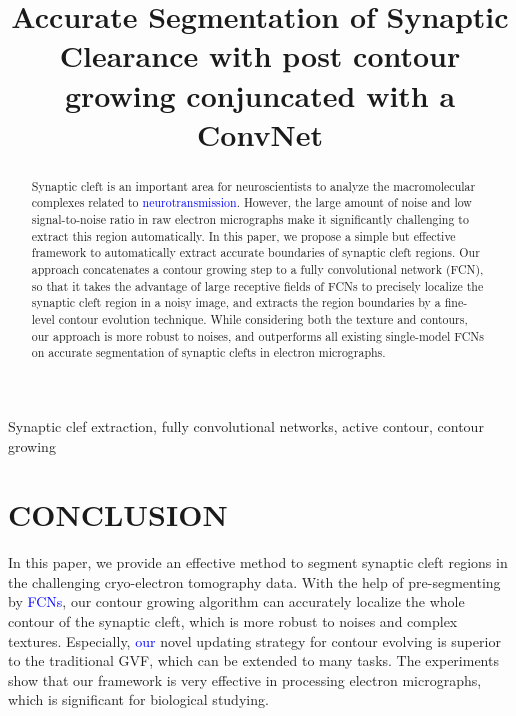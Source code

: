 \documentclass{article}
\newcommand{\change}[1]{\textcolor{blue}{#1}}
\begin{document}
\sloppy

\def\x{{\mathbf x}}
\def\L{{\cal L}}


\title{Accurate Segmentation of Synaptic Clearance with post contour growing conjuncated with a ConvNet}
%
\address{}


\maketitle


%
\begin{abstract}

Synaptic cleft is an important area for neuroscientists to analyze the macromolecular complexes related to \change{neurotransmission}.
However, the large amount of noise and low signal-to-noise ratio in raw electron micrographs make it significantly challenging to extract this region automatically.
%
In this paper, we propose a simple but effective framework to automatically extract accurate boundaries of synaptic cleft regions.
Our approach concatenates a contour growing step to a fully convolutional network (FCN), so that it takes the advantage of large receptive fields of FCNs to precisely localize the synaptic cleft region in a noisy image, and extracts the region boundaries by a fine-level contour evolution technique.
%
While considering both the texture and contours, our approach is more robust to noises, and outperforms all existing single-model FCNs on accurate segmentation of synaptic clefts in electron micrographs.


\end{abstract}
%
\begin{keywords}
Synaptic clef extraction, fully convolutional networks, active contour, contour growing
\end{keywords}
%

%




\section{CONCLUSION}
\label{sec:conclusion}

In this paper, we provide an effective method to segment synaptic cleft regions in the challenging cryo-electron tomography data.
%
With the help of pre-segmenting by \change{FCNs}, our contour growing algorithm can accurately localize the whole contour of the synaptic cleft, which is more robust to noises and complex textures.
Especially, \change{our} novel updating strategy for contour evolving is superior to the traditional GVF, which can be extended to many tasks.
The experiments show that our framework is very effective in processing electron micrographs, which is significant for biological studying.

%
%


\end{document}

